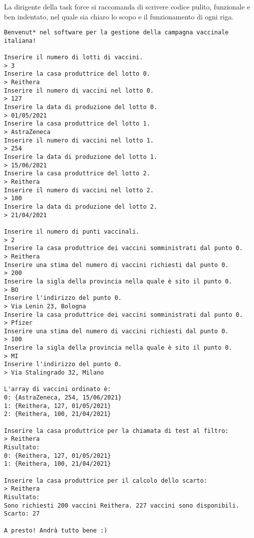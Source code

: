\documentclass[a4paper, 11pt]{exam}
\begin{document}
La dirigente della task force si raccomanda di scrivere codice pulito, funzionale e ben indentato, nel quale sia chiaro lo scopo e il funzionamento di ogni riga.

\begin{verbatim}
Benvenut* nel software per la gestione della campagna vaccinale italiana!

Inserire il numero di lotti di vaccini.
> 3
Inserire la casa produttrice del lotto 0.
> Reithera
Inserire il numero di vaccini nel lotto 0.
> 127
Inserire la data di produzione del lotto 0.
> 01/05/2021
Inserire la casa produttrice del lotto 1.
> AstraZeneca
Inserire il numero di vaccini nel lotto 1.
> 254
Inserire la data di produzione del lotto 1.
> 15/06/2021
Inserire la casa produttrice del lotto 2.
> Reithera
Inserire il numero di vaccini nel lotto 2.
> 100
Inserire la data di produzione del lotto 2.
> 21/04/2021

Inserire il numero di punti vaccinali. 
> 2
Inserire la casa produttrice dei vaccini somministrati dal punto 0. 
> Reithera
Inserire una stima del numero di vaccini richiesti dal punto 0.
> 200
Inserire la sigla della provincia nella quale è sito il punto 0.
> BO
Inserire l'indirizzo del punto 0.
> Via Lenin 23, Bologna
Inserire la casa produttrice dei vaccini somministrati dal punto 0. 
> Pfizer
Inserire una stima del numero di vaccini richiesti dal punto 0.
> 100
Inserire la sigla della provincia nella quale è sito il punto 0.
> MI
Inserire l'indirizzo del punto 0.
> Via Stalingrado 32, Milano

L'array di vaccini ordinato è:
0: {AstraZeneca, 254, 15/06/2021}
1: {Reithera, 127, 01/05/2021}
2: {Reithera, 100, 21/04/2021}

Inserire la casa produttrice per la chiamata di test al filtro:
> Reithera
Risultato:
0: {Reithera, 127, 01/05/2021}
1: {Reithera, 100, 21/04/2021}

Inserire la casa produttrice per il calcolo dello scarto:
> Reithera
Risultato:
Sono richiesti 200 vaccini Reithera. 227 vaccini sono disponibili.
Scarto: 27

A presto! Andrà tutto bene :)
\end{verbatim}
\end{document}

